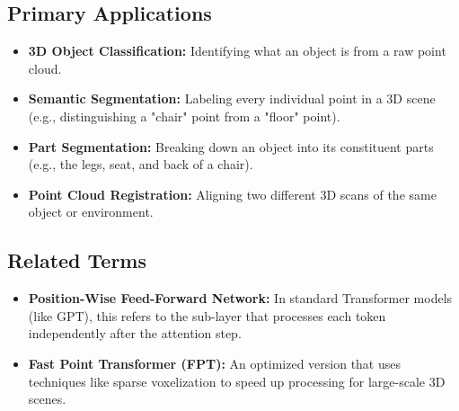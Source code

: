     \subsection*{Primary Applications}
        \begin{itemize}
            \item \textbf{3D Object Classification:} Identifying what an object is from a raw point cloud.
            \item \textbf{Semantic Segmentation:} Labeling every individual point in a 3D scene (e.g., distinguishing a "chair" point from a "floor" point).
            \item \textbf{Part Segmentation:} Breaking down an object into its constituent parts (e.g., the legs, seat, and back of a chair).
            \item \textbf{Point Cloud Registration:} Aligning two different 3D scans of the same object or environment.
        \end{itemize}
    
    \subsection*{Related Terms}
        \begin{itemize}
            \item \textbf{Position-Wise Feed-Forward Network:} In standard Transformer models (like GPT), this refers to the sub-layer that processes each token independently after the attention step.
            \item \textbf{Fast Point Transformer (FPT):} An optimized version that uses techniques like sparse voxelization to speed up processing for large-scale 3D scenes.
        \end{itemize}
